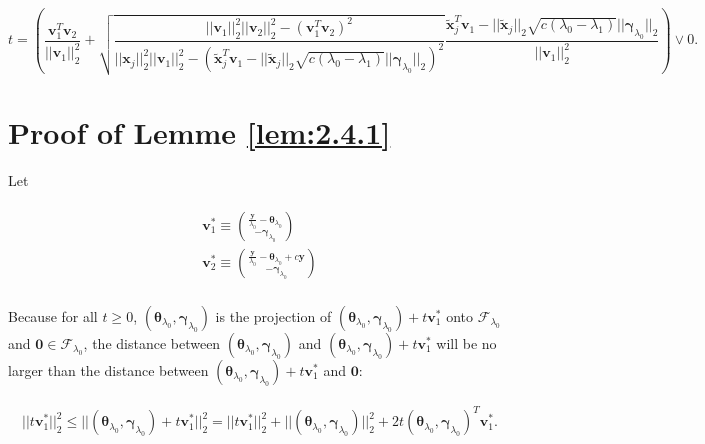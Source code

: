 \begin{equation}
    t=\left(\frac{\boldsymbol v_1^T\boldsymbol v_2}{||\boldsymbol v_1||_2^2}+\sqrt{\frac{||\boldsymbol v_1||_2^2||\boldsymbol v_2||_2^2-(\boldsymbol v_1^T\boldsymbol v_2)^2}{||\boldsymbol x_j||_2^2||\boldsymbol v_1||_2^2-\left(\tilde{\boldsymbol x}_j^T\boldsymbol v_1-||\tilde{\boldsymbol x}_j||_2\sqrt{c(\lambda_0-\lambda_1)}||\boldsymbol\gamma_{\lambda_0}||_2\right)^2}}\frac{\tilde{\boldsymbol x}_j^T\boldsymbol v_1-||\tilde{\boldsymbol x}_j||_2\sqrt{c(\lambda_0-\lambda_1)}||\boldsymbol\gamma_{\lambda_0}||_2}{||\boldsymbol v_1||_2^2}\right)\vee 0.
\end{equation}

\section{Proof of Lemme \ref{lem:2.4.1}}

Let

\begin{gather}
    \begin{aligned}
        \boldsymbol v_1^*\equiv\binom{\frac{\boldsymbol y}{\lambda_0}-\boldsymbol\theta_{\lambda_0}}{-\boldsymbol\gamma_{\lambda_0}}\\
        \boldsymbol v_2^*\equiv\binom{\frac{\boldsymbol y}{\lambda_0}-\boldsymbol\theta_{\lambda_0}+c\boldsymbol y}{-\boldsymbol\gamma_{\lambda_0}}\\
    \end{aligned}
\end{gather}

Because for all $t\geq 0$, $(\boldsymbol\theta_{\lambda_0},\boldsymbol\gamma_{\lambda_0})$ is the projection of $(\boldsymbol\theta_{\lambda_0},\boldsymbol\gamma_{\lambda_0})+t\boldsymbol v_1^*$ onto $\mathcal{F}_{\lambda_0}$ and $\boldsymbol 0\in \mathcal{F}_{\lambda_0}$, the distance between $(\boldsymbol\theta_{\lambda_0},\boldsymbol\gamma_{\lambda_0})$ and $(\boldsymbol\theta_{\lambda_0},\boldsymbol\gamma_{\lambda_0})+t\boldsymbol v_1^*$ will be no larger than the distance between $(\boldsymbol\theta_{\lambda_0},\boldsymbol\gamma_{\lambda_0})+t\boldsymbol v_1^*$ and $\boldsymbol 0$:

\begin{gather}
    \begin{aligned}
        ||t\boldsymbol v_1^*||_2^2\leq ||(\boldsymbol\theta_{\lambda_0},\boldsymbol\gamma_{\lambda_0})+t\boldsymbol v_1^*||_2^2=||t\boldsymbol v_1^*||_2^2+||(\boldsymbol\theta_{\lambda_0},\boldsymbol\gamma_{\lambda_0})||_2^2+2t(\boldsymbol\theta_{\lambda_0},\boldsymbol\gamma_{\lambda_0})^T\boldsymbol v_1^*.
    \end{aligned}
\end{gather}

